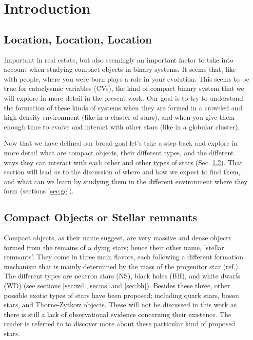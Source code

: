 \chapter{Introduction}
\thispagestyle{fancy}


\section{Location, Location, Location}

Important in real estate, but also seemingly an important factor to take into account when studying compact objects in binary systems. It seems that, like with people, where you were born plays a role in your evolution. This seems to be true for cataclysmic variables (CVs), the kind of compact binary system that we will explore in more detail in the present work. Our goal is to try to understand the formation of these kinds of systems when they are formed in a crowded and high density environment (like in a cluster of stars), and when you give them enough time to evolve and interact with other stars (like in a globular cluster).  

Now that we have defined our broad goal let's take a step back and explore in more detail what are compact objects, their different types, and the different ways they can interact with each other and other types of stars (Sec. \ref{sec:co}). That section will lead us to the discussion of where and how we expect to find them, and what can we learn by studying them in the different environment where they form (sections \ref{sec:gc}).

\section{Compact Objects or Stellar remnants}\label{sec:co}

Compact objects, as their name suggest, are very massive and dense objects formed from the remains of a dying stars; hence their other name, 'stellar remnants'. They come in three main flavors, each following a different formation mechanism that is mainly determined by the mass of the progenitor star (ref.). The different types are neutron stars (NS), black holes (BH), and white dwarfs (WD) (see sections \ref{sec:wd},\ref{sec:ns} and \ref{sec:bh}). Besides these three, other possible exotic types of stars have been proposed; including quark stars, boson stars, and Thorne-Zytkow objects. These will not be discussed in this work as there is still a lack of observational evidence concerning their existence. The reader is referred to \cite{cleymans_physics_1999} to discover more about these particular kind of proposed stars. 

